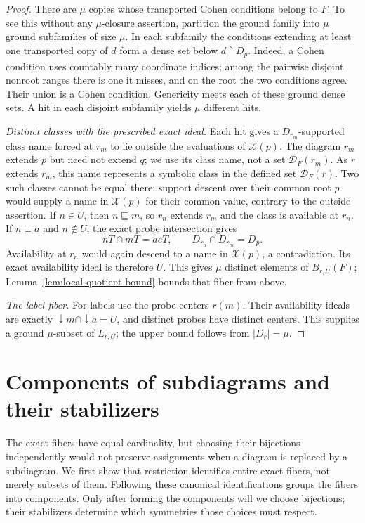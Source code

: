 \begin{proof}
There are $\mu$ copies whose transported Cohen conditions belong to
$F$. To see this without any $\mu$-closure assertion, partition the
ground family into $\mu$ ground subfamilies of size $\mu$. In each
subfamily the conditions extending at least one transported copy of
$d$ form a dense set below $d\restriction D_p$. Indeed, a Cohen
condition uses countably many coordinate indices; among the pairwise
disjoint nonroot ranges there is one it misses, and on the root the
two conditions agree. Their union is a Cohen condition. Genericity
meets each of these ground dense sets. A hit in each disjoint
subfamily yields $\mu$ different hits.

\smallskip\noindent\textit{Distinct classes with the prescribed exact ideal.}
Each hit gives a $D_{r_m}$-supported class name forced at $r_m$
to lie outside the evaluations of $\mathcal X(p)$. The diagram
$r_m$ extends $p$ but need not extend $q$; we use its class name,
not a set $\mathcal D_F(r_m)$. As $r$ extends $r_m$, this name
represents a symbolic class in the defined set $\mathcal D_F(r)$.
Two such
classes cannot be equal there: support descent over their common
root $p$ would supply a name in $\mathcal X(p)$ for their common
value, contrary to the outside assertion. If $n\in U$, then
$n\sqsubseteq m$, so $r_n$ extends $r_m$ and the class is available
at $r_n$. If $n\sqsubseteq a$ and $n\notin U$, the exact probe
intersection gives
\[
 nT\cap mT=aeT,
 \qquad D_{r_n}\cap D_{r_m}=D_p.
\]
Availability at $r_n$ would again descend to a name in
$\mathcal X(p)$, a contradiction. Its exact availability ideal is
therefore $U$. This gives $\mu$ distinct elements of $B_{r,U}(F)$;
Lemma~\ref{lem:local-quotient-bound} bounds that fiber from above.

\smallskip\noindent\textit{The label fiber.}
For labels use the probe centers $r(m)$. Their availability ideals
are exactly $\downarrow m\cap\downarrow a=U$, and distinct probes
have distinct centers. This supplies a ground $\mu$-subset of
$L_{r,U}$; the upper bound follows from $|D_r|=\mu$.
\end{proof}

\section{Components of subdiagrams and their stabilizers}
\label{sec:quotient-components}

The exact fibers have equal cardinality, but choosing their bijections
independently would not preserve assignments when a diagram is replaced
by a subdiagram. We first show that restriction identifies entire
exact fibers, not merely subsets of them. Following these canonical
identifications groups the fibers into components. Only after forming
the components will we choose bijections; their stabilizers determine
which symmetries those choices must respect.

